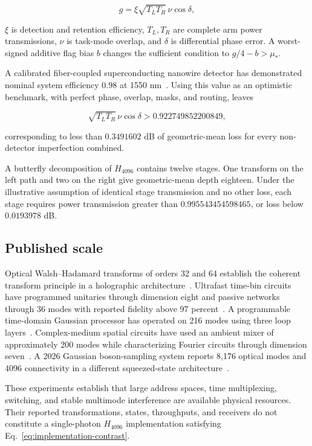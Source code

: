 \begin{equation}
g=\xi\sqrt{T_LT_R}\,\nu\cos\delta,
\end{equation}

$\xi$ is detection and retention efficiency, $T_L,T_R$ are complete arm power transmissions, $\nu$ is task-mode overlap, and $\delta$ is differential phase error. A worst-signed additive flag bias $b$ changes the sufficient condition to $g/4-b>\mu_*$.

A calibrated fiber-coupled superconducting nanowire detector has demonstrated nominal system efficiency $0.98$ at 1550 nm~\cite{ReddyEtAl2020}. Using this value as an optimistic benchmark, with perfect phase, overlap, masks, and routing, leaves

\begin{equation}
\sqrt{T_LT_R}\,\nu\cos\delta
>0.922749852200849,
\end{equation}

corresponding to less than $0.3491602$ dB of geometric-mean loss for every non-detector imperfection combined.

A butterfly decomposition of $H_{4096}$ contains twelve stages. One transform on the left path and two on the right give geometric-mean depth eighteen. Under the illustrative assumption of identical stage transmission and no other loss, each stage requires power transmission greater than $0.995543454598465$, or loss below $0.0193978$ dB.

\subsection{Published scale}

Optical Walsh--Hadamard transforms of orders 32 and 64 establish the coherent transform principle in a holographic architecture~\cite{ChenEtAl1988}. Ultrafast time-bin circuits have programmed unitaries through dimension eight and passive networks through 36 modes with reported fidelity above 97 percent~\cite{BouchardEtAl2024}. A programmable time-domain Gaussian processor has operated on 216 modes using three loop layers~\cite{MadsenEtAl2022}. Complex-medium spatial circuits have used an ambient mixer of approximately 200 modes while characterizing Fourier circuits through dimension seven~\cite{GoelEtAl2024}. A 2026 Gaussian boson-sampling system reports 8,176 optical modes and 4096 connectivity in a different squeezed-state architecture~\cite{LiuEtAl2026}.

These experiments establish that large address spaces, time multiplexing, switching, and stable multimode interference are available physical resources. Their reported transformations, states, throughputs, and receivers do not constitute a single-photon $H_{4096}$ implementation satisfying Eq.~\eqref{eq:implementation-contrast}.

